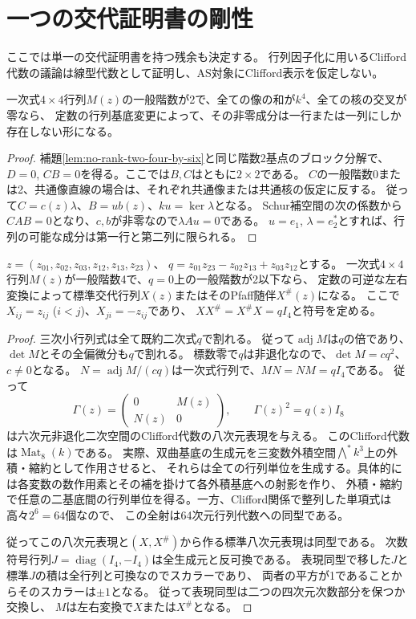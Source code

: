 \section{一つの交代証明書の剛性}
\label{sec:single-negative-rigidity}
ここでは単一の交代証明書を持つ残余も決定する。
行列因子化に用いるClifford代数の議論は線型代数として証明し、AS対象にClifford表示を仮定しない。

\begin{lemma}\label{lem:rank-two-square-compression}
一次式$4\times4$行列$M(z)$の一般階数が2で、全ての像の和が$k^4$、全ての核の交叉が零なら、
定数の行列基底変更によって、その非零成分は一行または一列にしか存在しない形になる。
\end{lemma}
\begin{proof}
補題\ref{lem:no-rank-two-four-by-six}と同じ階数2基点のブロック分解で、
$D=0$, $CB=0$を得る。ここでは$B,C$はともに$2\times2$である。
$C$の一般階数0または2、共通像直線の場合は、それぞれ共通像または共通核の仮定に反する。
従って$C=c(z)\lambda$、$B=u b(z)$、$ku=\ker\lambda$となる。
Schur補空間の次の係数から$CAB=0$となり、$c,b$が非零なので$\lambda A u=0$である。
$u=e_1$, $\lambda=e_2^*$とすれば、行列の可能な成分は第一行と第二列に限られる。
\end{proof}

\begin{lemma}\label{lem:klein-four-matrix-factorization}
$z=(z_{01},z_{02},z_{03},z_{12},z_{13},z_{23})$、
$q=z_{01}z_{23}-z_{02}z_{13}+z_{03}z_{12}$とする。
一次式$4\times4$行列$M(z)$が一般階数4で、$q=0$上の一般階数が2以下なら、
定数の可逆な左右変換によって標準交代行列$X(z)$またはそのPfaff随伴$X^\#(z)$になる。
ここで$X_{ij}=z_{ij}$ ($i<j$)、$X_{ji}=-z_{ij}$であり、
$XX^\#=X^\#X=qI_4$と符号を定める。
\end{lemma}
\begin{proof}
三次小行列式は全て既約二次式$q$で割れる。
従って$\operatorname{adj}M$は$q$の倍であり、$\det M$とその全偏微分も$q$で割れる。
標数零で$q$は非退化なので、$\det M=cq^2$、$c\ne0$となる。
$N=\operatorname{adj}M/(cq)$は一次式行列で、$MN=NM=qI_4$である。
従って
\[
 \Gamma(z)=\begin{pmatrix}0&M(z)\\N(z)&0\end{pmatrix},\qquad \Gamma(z)^2=q(z)I_8
\]
は六次元非退化二次空間のClifford代数の八次元表現を与える。
このClifford代数は$\operatorname{Mat}_8(k)$である。
実際、双曲基底の生成元を三変数外積空間$\bigwedge^*k^3$上の外積・縮約として作用させると、
それらは全ての行列単位を生成する。具体的には各変数の数作用素とその補を掛けて各外積基底への射影を作り、
外積・縮約で任意の二基底間の行列単位を得る。一方、Clifford関係で整列した単項式は高々$2^6=64$個なので、
この全射は64次元行列代数への同型である。

従ってこの八次元表現と$(X,X^\#)$から作る標準八次元表現は同型である。
次数符号行列$J=\operatorname{diag}(I_4,-I_4)$は全生成元と反可換である。
表現同型で移した$J$と標準$J$の積は全行列と可換なのでスカラーであり、
両者の平方が1であることからそのスカラーは$\pm1$となる。
従って表現同型は二つの四次元次数部分を保つか交換し、
$M$は左右変換で$X$または$X^\#$となる。
\end{proof}

